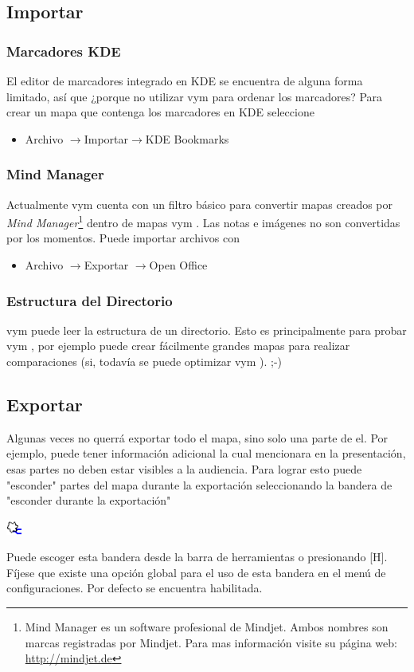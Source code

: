 \documentclass{article}
\newcommand{\vym}{{\sc vym }}
\newcommand{\ra}{$\longrightarrow$}
\newcommand{\key}[1]{[#1]}
\begin{document}
\subsection{Importar} \label{import}

\subsubsection*{Marcadores KDE}
El editor de marcadores integrado en KDE se encuentra de alguna forma limitado, as\'i que ¿porque no utilizar \vym para ordenar los marcadores? Para crear un mapa que contenga los marcadores en KDE seleccione
\begin{itemize}
    \item Archivo \ra Importar\ra KDE Bookmarks
\end{itemize}

\subsubsection*{Mind Manager}
Actualmente \vym cuenta con un filtro b\'asico para convertir mapas creados por {\em Mind Manager}\footnote{
Mind Manager es un software profesional de Mindjet. Ambos nombres son marcas registradas por Mindjet. Para mas informaci\'on visite su p\'agina web: \href{http://mindjet.de}{http://mindjet.de}} dentro de mapas \vym. Las notas e im\'agenes no son convertidas por los momentos. Puede importar archivos con

\begin{itemize}
    \item Archivo \ra Exportar \ra Open Office
\end{itemize}


\subsubsection*{Estructura del Directorio}
\vym puede leer la estructura de un directorio. Esto es principalmente para probar \vym, por ejemplo puede crear f\'acilmente grandes mapas para realizar comparaciones (si, todav\'ia se puede optimizar \vym). ;-)


\subsection{Exportar}  \label{export}
\label{hideexport}
Algunas veces no querr\'a exportar todo el mapa, sino solo una parte de el. Por ejemplo, puede tener informaci\'on adicional la cual mencionara en la presentaci\'on, esas partes no deben estar visibles a la audiencia. Para lograr esto puede "esconder" partes del mapa durante la exportaci\'on seleccionando la bandera de "esconder durante la exportaci\'on"
\begin{center}
    \includegraphics[width=0.5cm]{images/flag-hideexport.png}
\end{center}
Puede escoger esta bandera desde la barra de herramientas o presionando \key{H}. F\'ijese que existe una opci\'on global para el uso de esta bandera en el men\'u de configuraciones. Por defecto se encuentra habilitada.
\end{document}
